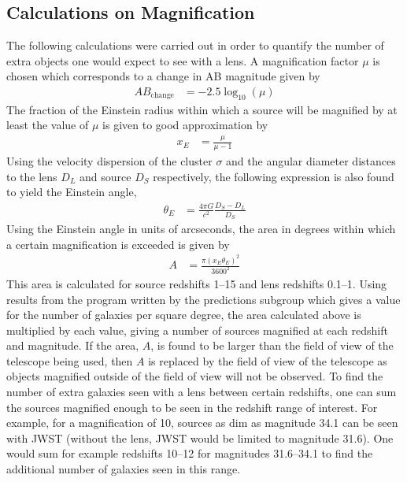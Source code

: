 
\subsection{Calculations on Magnification} %
\label{sub:calculations_on_magnification}
	The following calculations were carried out in order to quantify the number of extra objects one would expect to see with a lens. A magnification factor $\mu$ is chosen which corresponds to a change in AB magnitude given by
	\begin{align}
		AB_\text{change} &= -2.5\log_{10}(\mu)
	\end{align}
	The fraction of the Einstein radius within which a source will be magnified by at least the value of $\mu$ is given to good approximation by\cite{Lens_mass_estimate}
	\begin{align}
		x_E &= \frac{\mu}{\mu -1}
	\end{align}
	Using the velocity dispersion of the cluster $\sigma$ and the angular diameter distances to the lens $D_L$ and source $D_S$ respectively, the following expression is also found to yield the Einstein angle,
	\begin{align}
		\theta_E &= \frac{4\pi G}{c^2}\frac{D_S-D_L}{D_S}
	\end{align}
	Using the Einstein angle in units of arcseconds, the area in degrees within which a certain magnification is exceeded is given by
	\begin{align}
		A &= \frac{\pi(x_E \theta_E)^2}{3600^2}
	\end{align}
	This area is calculated for source redshifts 1--15 and lens redshifts 0.1--1. Using results from the program written by the predictions subgroup which gives a value for the number of galaxies per square degree, the area calculated above is multiplied by each value, giving a number of sources magnified at each redshift and magnitude. If the area, $A$, is found to be larger than the field of view of the telescope being used, then $A$ is replaced by the field of view of the telescope as objects magnified outside of the field of view will not be observed. To find the number of extra galaxies seen with a lens between certain redshifts, one can sum the sources magnified enough to be seen in the redshift range of interest. For example, for a magnification of 10, sources as dim as magnitude 34.1 can be seen with JWST (without the lens, JWST would be limited to magnitude 31.6). One would sum for example redshifts 10--12 for magnitudes 31.6--34.1 to find the additional number of galaxies seen in this range.

